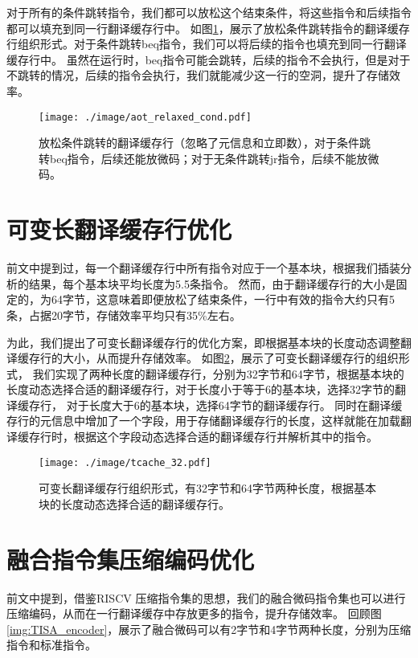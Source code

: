 对于所有的条件跳转指令，我们都可以放松这个结束条件，将这些指令和后续指令都可以填充到同一行翻译缓存行中。
如图\ref{img:aot_relaxed_cond}，展示了放松条件跳转指令的翻译缓存行组织形式。对于条件跳转beq指令，我们可以将后续的指令也填充到同一行翻译缓存行中。
虽然在运行时，beq指令可能会跳转，后续的指令不会执行，但是对于不跳转的情况，后续的指令会执行，我们就能减少这一行的空洞，提升了存储效率。


\begin{figure}[!htbp]
    \centering
    \texttt{[image: ./image/aot\_relaxed\_cond.pdf]}
    \caption{放松条件跳转的翻译缓存行（忽略了元信息和立即数），对于条件跳转beq指令，后续还能放微码；对于无条件跳转jr指令，后续不能放微码。}
    \label{img:aot_relaxed_cond}
  \end{figure}


\section{可变长翻译缓存行优化}

前文中提到过，每一个翻译缓存行中所有指令对应于一个基本块，根据我们插装分析的结果，每个基本块平均长度为5.5条指令。
然而，由于翻译缓存行的大小是固定的，为64字节，这意味着即便放松了结束条件，一行中有效的指令大约只有5条，占据20字节，存储效率平均只有35\%左右。

为此，我们提出了可变长翻译缓存行的优化方案，即根据基本块的长度动态调整翻译缓存行的大小，从而提升存储效率。
如图\ref{img:tcache_32}，展示了可变长翻译缓存行的组织形式，
我们实现了两种长度的翻译缓存行，分别为32字节和64字节，根据基本块的长度动态选择合适的翻译缓存行，对于长度小于等于6的基本块，选择32字节的翻译缓存行，
对于长度大于6的基本块，选择64字节的翻译缓存行。
同时在翻译缓存行的元信息中增加了一个字段，用于存储翻译缓存行的长度，这样就能在加载翻译缓存行时，根据这个字段动态选择合适的翻译缓存行并解析其中的指令。

\begin{figure}[!htbp]
    \centering
    \texttt{[image: ./image/tcache\_32.pdf]}
    \caption{可变长翻译缓存行组织形式，有32字节和64字节两种长度，根据基本块的长度动态选择合适的翻译缓存行。}
    \label{img:tcache_32}
  \end{figure}


\section{融合指令集压缩编码优化}

前文中提到，借鉴RISCV 压缩指令集的思想，我们的融合微码指令集也可以进行压缩编码，从而在一行翻译缓存中存放更多的指令，提升存储效率。
回顾图\ref{img:TISA_encoder}，展示了融合微码可以有2字节和4字节两种长度，分别为压缩指令和标准指令。

